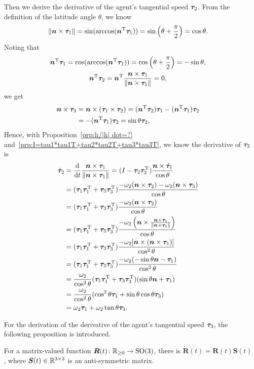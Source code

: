 \documentclass[5p,authoryear,preprint]{elsarticle}\linenofalse
\begin{document}
Then we derive the derivative of the agent's tangential speed $\bm{\tau}_2$.
From the definition of the latitude angle $\theta$, we know
\[
\|\bm{n}\times\bm{\tau}_1\|=\sin(\arccos(\bm{n}^\mathrm{T}\bm{\tau}_1))=\sin\left(\theta+\frac\pi2\right)=\cos\theta.
\]
Noting that
\begin{gather*}
	\bm{n}^\mathrm{T}\bm{\tau}_1=\cos(\arccos(\bm{n}^\mathrm{T}\bm{\tau}_1))=\cos\left(\theta+\frac\pi2\right)=-\sin\theta,\\
	\bm{n}^\mathrm{T}\bm{\tau}_2=\bm{n}^\mathrm{T}\frac{\bm{n}\times\bm{\tau}_1}{\|\bm{n}\times\bm{\tau}_1\|}=0,
\end{gather*}
we get
\begin{align*}
	\bm{n}\times\bm{\tau}_3&=\bm{n}\times(\bm{\tau}_1\times\bm{\tau}_2)=(\bm{n}^\mathrm{T}\bm{\tau}_2)\bm{\tau}_1-(\bm{n}^\mathrm{T}\bm{\tau}_1)\bm{\tau}_2\\
	&=-(\bm{n}^\mathrm{T}\bm{\tau}_1)\bm{\tau}_2=\sin\theta\bm{\tau}_2,
\end{align*}
Hence, with Proposition~\ref{prp:h/|h| dot=?} and~\ref{prp:I=tau1*tau1T+tau2*tau2T+tau3*tau3T}, we know the derivative of $\bm{\tau}_2$ is
\begin{equation}\label{eqn:tau2 dot=?}\begin{aligned}
	\dot{\bm{\tau}}_2&=\frac{\mathrm d}{\mathrm dt}\frac{\bm{n}\times\bm{\tau}_1}{\|\bm{n}\times\bm{\tau}_1\|}=(I-\bm{\tau}_2\bm{\tau}_2^\mathrm{T})\frac{\bm{n}\times\dot{\bm{\tau}}_1}{\cos\theta}\\
	&=(\bm{\tau}_1\bm{\tau}_1^\mathrm{T}+\bm{\tau}_3\bm{\tau}_3^\mathrm{T})\frac{-\omega_2(\bm{n}\times\bm{\tau}_2)-\omega_3(\bm{n}\times\bm{\tau}_3)}{\cos\theta}\\
	&=(\bm{\tau}_1\bm{\tau}_1^\mathrm{T}+\bm{\tau}_3\bm{\tau}_3^\mathrm{T})\frac{-\omega_2(\bm{n}\times\bm{\tau}_2)}{\cos\theta}\\
	&=(\bm{\tau}_1\bm{\tau}_1^\mathrm{T}+\bm{\tau}_3\bm{\tau}_3^\mathrm{T})\frac{-\omega_2\left(\bm{n}\times\frac{\bm{n}\times\bm{\tau}_1}{\|\bm{n}\times\bm{\tau}_1\|}\right)}{\cos\theta}\\
	&=(\bm{\tau}_1\bm{\tau}_1^\mathrm{T}+\bm{\tau}_3\bm{\tau}_3^\mathrm{T})\frac{-\omega_2[\bm{n}\times(\bm{n}\times\bm{\tau}_1)]}{\cos^2\theta}\\
	&=(\bm{\tau}_1\bm{\tau}_1^\mathrm{T}+\bm{\tau}_3\bm{\tau}_3^\mathrm{T})\frac{-\omega_2(-\sin\theta\bm{n}-\bm{\tau}_1)}{\cos^2\theta}\\
	&=\frac{\omega_2}{\cos^2\theta}(\bm{\tau}_1\bm{\tau}_1^\mathrm{T}+\bm{\tau}_3\bm{\tau}_3^\mathrm{T})(\sin\theta\bm{n}+\bm{\tau}_1)\\
	&=\frac{\omega_2}{\cos^2\theta}(\cos^2\theta\bm{\tau}_1+\sin\theta\cos\theta\bm{\tau}_3)\\
	&=\omega_2\bm{\tau}_1+\omega_2\tan\theta\bm{\tau}_3.
\end{aligned}\end{equation}

For the derivation of the derivative of the agent's tangential speed $\bm{\tau}_3$, the following proposition is introduced.

\begin{proposition}\label{prp:R dot=RS}
	For a matrix-valued function $\bm R(t)\colon\mathbb{R}_{\ge0}\to\mathrm{SO}(3)$, there is
	$\dot{\bm R}(t)=\bm R(t)\bm S(t)$,
	where $\bm S(t)\in\mathbb{R}^{3\times3}$ is an anti-symmetric matrix.
\end{proposition}
\end{document}
